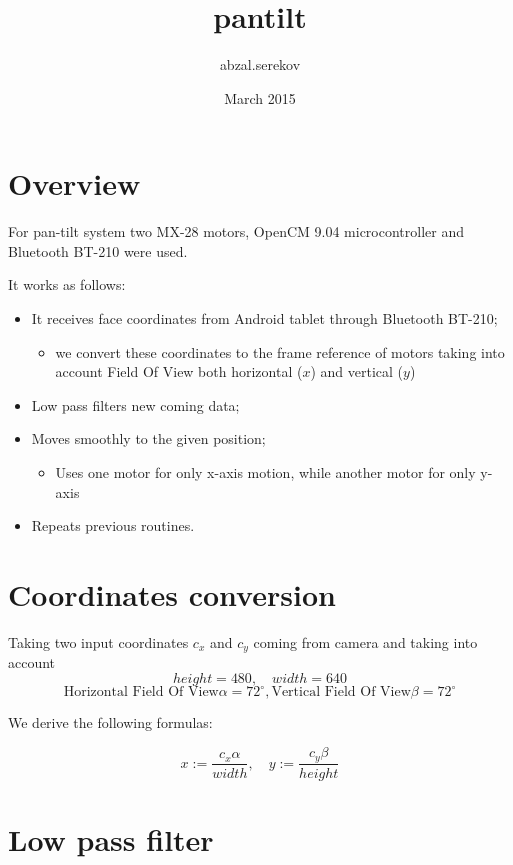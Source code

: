 \documentclass{article}
\title{pantilt}
\author{abzal.serekov }
\date{March 2015}
\begin{document}
\maketitle

\section{Overview}
For pan-tilt system two MX-28 motors, OpenCM 9.04 microcontroller and Bluetooth BT-210 were used.

It works as follows:
\begin{itemize}
\item It receives face coordinates from Android tablet through Bluetooth BT-210;

\begin{itemize}

\item we convert these coordinates to the frame reference of motors taking into account Field Of View both horizontal ($x$) and vertical ($y$)

\end{itemize}

\item Low pass filters new coming data;
\item Moves smoothly to the given position;
\begin{itemize}
\item Uses one motor for only x-axis motion, while another motor for only y-axis
\end{itemize}
\item Repeats previous routines.
\end{itemize}


\section{Coordinates conversion}

Taking two input coordinates $c_x$ and $c_y$ coming from camera and taking into account 
\[height = 480, \quad width = 640\]
\[\text{Horizontal Field Of View}  \alpha =72^\circ{} , \text{Vertical Field Of View}  \beta = 72^\circ{}\]

We derive the following formulas:

\[ x := \displaystyle \frac{c_x \alpha}{width},\quad y := \displaystyle \frac{c_y \beta}{height} \]

\section{Low pass filter}
\end{document}
